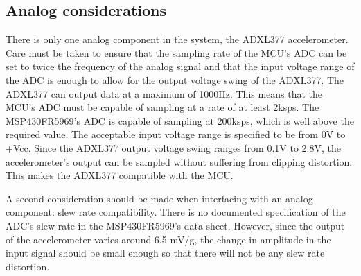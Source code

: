   \vspace{-2cm}
  

\subsection{Analog considerations}
There is only one analog component in the system, the ADXL377 accelerometer. Care must be taken to ensure that the sampling rate of the MCU's ADC can be set to twice the frequency of the analog signal and that the input voltage range of the ADC is enough to allow for the output voltage swing of the ADXL377. The ADXL377 can output data at a maximum of 1000Hz.  This means that the MCU's ADC must be capable of sampling at a rate of at least 2ksps. The MSP430FR5969's ADC is capable of sampling at 200ksps, which is well above the required value.  The acceptable input voltage range is specified to be from 0V to +Vcc. Since the ADXL377 output voltage swing ranges from 0.1V to 2.8V, the accelerometer's output can be sampled without suffering from clipping distortion.  This makes the ADXL377 compatible with the MCU.

A second consideration should be made when interfacing with an analog component: slew rate compatibility. There is no documented specification of the ADC's slew rate in the MSP430FR5969's data sheet. However, since the output of the accelerometer varies around 6.5 mV/g, the change in amplitude in the input signal should be small enough so that there will not be any slew rate distortion.

